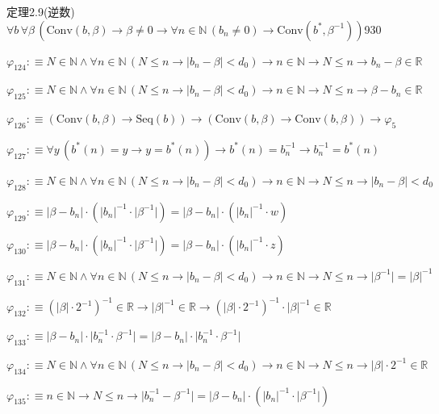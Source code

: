 \begin{fullproof}{定理2.9(逆数)}{$\forall b\,\forall \beta\,(\mathrm{Conv}(b,\beta) \to \beta \neq 0 \to \forall n \in \mathbb{N}\,(b_{n} \neq 0) \to \mathrm{Conv}(b^{\ast},\beta^{-1}))$}{930}
\begin{abbrevlist}
\item $\varphi_{124} :\equiv N \in \mathbb{N} \land \forall n \in \mathbb{N}\,(N \leq n \to \lvert b_{n} - \beta \rvert < d_{0}) \to n \in \mathbb{N} \to N \leq n \to b_{n} - \beta \in \mathbb{R}$
\item $\varphi_{125} :\equiv N \in \mathbb{N} \land \forall n \in \mathbb{N}\,(N \leq n \to \lvert b_{n} - \beta \rvert < d_{0}) \to n \in \mathbb{N} \to N \leq n \to \beta - b_{n} \in \mathbb{R}$
\item $\varphi_{126} :\equiv (\mathrm{Conv}(b,\beta) \to \mathrm{Seq}(b)) \to (\mathrm{Conv}(b,\beta) \to \mathrm{Conv}(b,\beta)) \to \varphi_{5}$
\item $\varphi_{127} :\equiv \forall y\,(b^{\ast}(n) = y \to y = b^{\ast}(n)) \to b^{\ast}(n) = b_{n}^{-1} \to b_{n}^{-1} = b^{\ast}(n)$
\item $\varphi_{128} :\equiv N \in \mathbb{N} \land \forall n \in \mathbb{N}\,(N \leq n \to \lvert b_{n} - \beta \rvert < d_{0}) \to n \in \mathbb{N} \to N \leq n \to \lvert b_{n} - \beta \rvert < d_{0}$
\item $\varphi_{129} :\equiv \lvert \beta - b_{n} \rvert \cdot (\lvert b_{n} \rvert^{-1} \cdot \lvert \beta^{-1} \rvert) = \lvert \beta - b_{n} \rvert \cdot (\lvert b_{n} \rvert^{-1} \cdot w)$
\item $\varphi_{130} :\equiv \lvert \beta - b_{n} \rvert \cdot (\lvert b_{n} \rvert^{-1} \cdot \lvert \beta^{-1} \rvert) = \lvert \beta - b_{n} \rvert \cdot (\lvert b_{n} \rvert^{-1} \cdot z)$
\item $\varphi_{131} :\equiv N \in \mathbb{N} \land \forall n \in \mathbb{N}\,(N \leq n \to \lvert b_{n} - \beta \rvert < d_{0}) \to n \in \mathbb{N} \to N \leq n \to \lvert \beta^{-1} \rvert = \lvert \beta \rvert^{-1}$
\item $\varphi_{132} :\equiv (\lvert \beta \rvert \cdot 2^{-1})^{-1} \in \mathbb{R} \to \lvert \beta \rvert^{-1} \in \mathbb{R} \to (\lvert \beta \rvert \cdot 2^{-1})^{-1} \cdot \lvert \beta \rvert^{-1} \in \mathbb{R}$
\item $\varphi_{133} :\equiv \lvert \beta - b_{n} \rvert \cdot \lvert b_{n}^{-1} \cdot \beta^{-1} \rvert = \lvert \beta - b_{n} \rvert \cdot \lvert b_{n}^{-1} \cdot \beta^{-1} \rvert$
\item $\varphi_{134} :\equiv N \in \mathbb{N} \land \forall n \in \mathbb{N}\,(N \leq n \to \lvert b_{n} - \beta \rvert < d_{0}) \to n \in \mathbb{N} \to N \leq n \to \lvert \beta \rvert \cdot 2^{-1} \in \mathbb{R}$
\item $\varphi_{135} :\equiv n \in \mathbb{N} \to N \leq n \to \lvert b_{n}^{-1} - \beta^{-1} \rvert = \lvert \beta - b_{n} \rvert \cdot (\lvert b_{n} \rvert^{-1} \cdot \lvert \beta^{-1} \rvert)$

\end{abbrevlist}
\end{fullproof}
